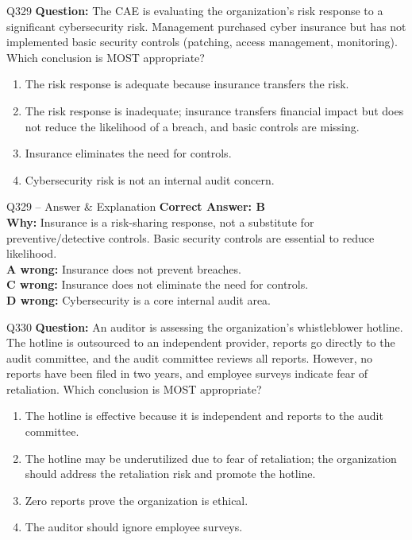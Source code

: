 \documentclass[aspectratio=169,10pt]{beamer}
\begin{document}
	\begin{frame}[t]{Q329}
		\small
		\textbf{Question:} The CAE is evaluating the organization's risk response to a significant cybersecurity risk. Management purchased cyber insurance but has not implemented basic security controls (patching, access management, monitoring). Which conclusion is MOST appropriate?
		\begin{enumerate}[label=\Alph*.,itemsep=1pt,topsep=2pt]
			\item The risk response is adequate because insurance transfers the risk.
			\item The risk response is inadequate; insurance transfers financial impact but does not reduce the likelihood of a breach, and basic controls are missing.
			\item Insurance eliminates the need for controls.
			\item Cybersecurity risk is not an internal audit concern.
		\end{enumerate}
	\end{frame}
	
	\begin{frame}[t]{Q329 -- Answer \& Explanation}
		\small
		\textbf{Correct Answer: B} \\[4pt]
		\textbf{Why:} Insurance is a risk-sharing response, not a substitute for preventive/detective controls. Basic security controls are essential to reduce likelihood. \\[4pt]
		\textbf{A wrong:} Insurance does not prevent breaches. \\[2pt]
		\textbf{C wrong:} Insurance does not eliminate the need for controls. \\[2pt]
		\textbf{D wrong:} Cybersecurity is a core internal audit area.
	\end{frame}
	
	\begin{frame}[t]{Q330}
		\small
		\textbf{Question:} An auditor is assessing the organization's whistleblower hotline. The hotline is outsourced to an independent provider, reports go directly to the audit committee, and the audit committee reviews all reports. However, no reports have been filed in two years, and employee surveys indicate fear of retaliation. Which conclusion is MOST appropriate?
		\begin{enumerate}[label=\Alph*.,itemsep=1pt,topsep=2pt]
			\item The hotline is effective because it is independent and reports to the audit committee.
			\item The hotline may be underutilized due to fear of retaliation; the organization should address the retaliation risk and promote the hotline.
			\item Zero reports prove the organization is ethical.
			\item The auditor should ignore employee surveys.
		\end{enumerate}
	\end{frame}
	
\end{document}
